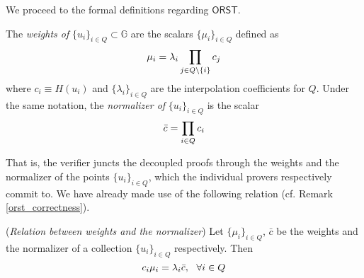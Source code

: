 \documentclass{iacrtrans}
\begin{document}
\noindent
We proceed to the formal definitions regarding $\mathsf{ORST}$.

\begin{defn}\label{orst_weights_definition}
The \textit{weights of}
$\{u_i\}_{i \in Q} \subset \mathbb{G}$
are the scalars
$\{\mu_i\}_{i \in Q}$
defined as
\vspace{+2pt}
\begin{equation}\label{orst_weights}
\mu_i =\lambda_i \prod_{j \in Q \setminus \{i\}} c_j
\vspace{5pt}
\end{equation}
where $c_i \equiv H(u_i)$ and
$\{\lambda_i\}_{i \in Q }$ are the interpolation
coefficients for $Q$.
Under the same notation,
the \textit{normalizer of} $\{u_i\}_{i \in Q}$ is the scalar
\vspace{5pt}
\begin{equation}\label{orst_normalizer}
\bar{c} = \prod_{i \in Q} c_i
\vspace{5pt}
\end{equation}
\end{defn}
\noindent
That is, the verifier juncts the decoupled
proofs through the weights and the normalizer
of the points $\{u_i\}_{i \in Q}$,
which the individual provers respectively commit to.
We have already made use of
the following relation
(cf. Remark \ref{orst_correctness}).

\begin{rem}\label{orst_core_remark}
(\textit{Relation between weights and the normalizer})
Let $\{\mu_i\}_{i \in Q}$, $\bar{c}$ be the weights
and the normalizer of a collection $\{u_i\}_{i \in Q}$
respectively. Then
\vspace{5pt}
\begin{equation}\label{orst_core}
c_i \mu_i = \lambda_i \bar{c},\ \ \forall i \in Q
\vspace{5pt}
\end{equation}
\end{rem}
\end{document}

